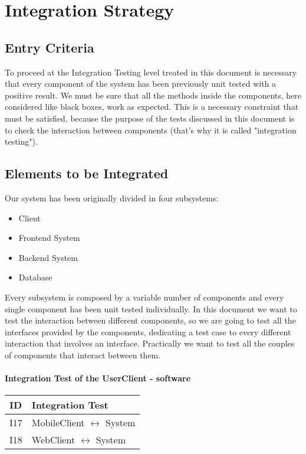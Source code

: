 \section{Integration Strategy}
	\subsection{Entry Criteria}
	To proceed at the Integration Testing level treated in this document is necessary that every
	component of the system has been previously unit tested with a positive result.
	We must be sure that all the methods inside the components, here considered like black boxes,
	work as expected.
	This is a necessary constraint that must be satisfied, because the purpose of the tests discussed in this
	document is to check the interaction between components (that's why it is called "integration testing").
	\subsection{Elements to be Integrated}
	Our system has been originally divided in four subsystems:
	\begin{itemize}
		\item Client
		\item Frontend System
		\item Backend System
		\item Database
	\end{itemize}
	Every subsystem is composed by a variable number of components and every single component has been
	unit tested individually. In this document we want to test the interaction between different components,
	so we are going to test all the interfaces provided by the components, dedicating a test case to every
	different interaction that involves an interface. Practically we want to test all the couples of components
	that interact between them.
	\paragraph{Integration Test of the UserClient - software}
	\begin{tabular}{p{2cm} | p{10cm}} \hline
		\textbf{ID} & \textbf{Integration Test} \\ \hline
		I17 & MobileClient $\leftrightarrow$ System \\ \hline
		I18 & WebClient $\leftrightarrow$ System \\ \hline
	\end{tabular}
